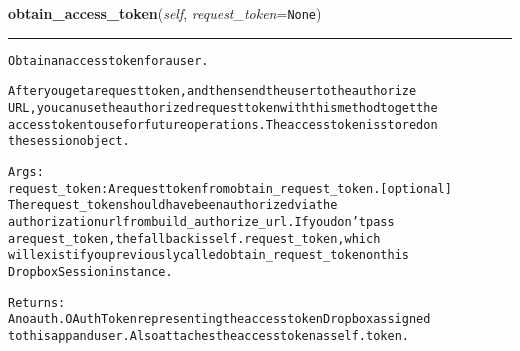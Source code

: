 \hspace{.8\funcindent}\begin{boxedminipage}{\funcwidth}

    \raggedright \textbf{obtain\_access\_token}(\textit{self}, \textit{request\_token}={\tt None})

    \vspace{-1.5ex}

    \rule{\textwidth}{0.5\fboxrule}
\setlength{\parskip}{2ex}
\begin{alltt}
Obtain an access token for a user.

After you get a request token, and then send the user to the authorize
URL, you can use the authorized request token with this method to get the
access token to use for future operations. The access token is stored on
the session object.

Args:
    request\_token: A request token from obtain\_request\_token. [optional]
        The request\_token should have been authorized via the
        authorization url from build\_authorize\_url. If you don't pass
        a request\_token, the fallback is self.request\_token, which
        will exist if you previously called obtain\_request\_token on this
        DropboxSession instance.

Returns:
    An oauth.OAuthToken representing the access token Dropbox assigned
    to this app and user. Also attaches the access token as self.token.
\end{alltt}

\setlength{\parskip}{1ex}
    \end{boxedminipage}

    \label{lib:dropbox:DropboxSession:build_access_headers}

    \vspace{0.5ex}

